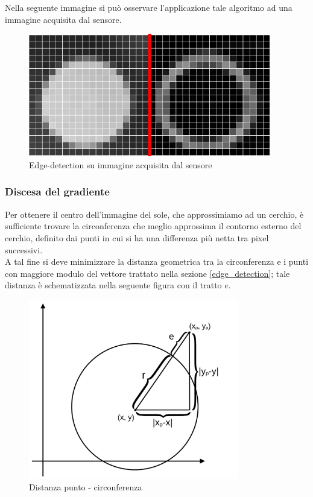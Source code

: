 \documentclass[12pt]{article}
\begin{document}
        
        Nella seguente immagine si può osservare l'applicazione tale algoritmo ad una immagine acquisita dal sensore.
        
        \begin{figure}[h]
        \centering
            \includegraphics[width=300pt]{Draws/default_image-gradient.png}
            \caption{Edge-detection su immagine acquisita dal sensore}
            \label{edge-detection_image_comparison}
        \end{figure}
        
        
        \subsubsection{Discesa del gradiente}\label{gradient_descent}
        Per ottenere il centro dell'immagine del sole, che approssimiamo ad un cerchio, è sufficiente trovare la circonferenza che meglio approssima il contorno esterno del cerchio, definito dai punti in cui si ha una differenza più netta tra pixel successivi. \\
        A tal fine si deve minimizzare la distanza geometrica tra la circonferenza e i punti con maggiore modulo del vettore trattato nella sezione \ref{edge_detection}; tale distanza è schematizzata nella seguente figura con il tratto $ e $.

        \begin{figure}[h]
        \centering
            \includegraphics[width=260pt]{Draws/Discesa_del_gradiente_cerchio-punto.png}
            \caption{Distanza punto - circonferenza}
        \end{figure}
        
\end{document}
